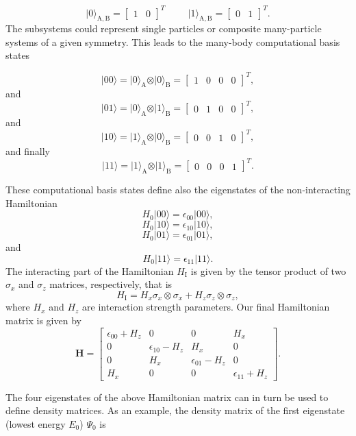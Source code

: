 \documentclass[%
oneside,                 %
final,                   %
10pt]{article}
\begin{document}
\[
\vert 0\rangle_{\mathrm{A,B}}=\begin{bmatrix} 1 & 0\end{bmatrix}^T \hspace{1cm} \vert 1\rangle_{\mathrm{A,B}}=\begin{bmatrix} 0 & 1\end{bmatrix}^T.
\]
The subsystems could represent single particles or composite many-particle systems of a given symmetry.
This leads to the many-body computational basis states

\[
\vert 00\rangle = \vert 0\rangle_{\mathrm{A}}\otimes \vert 0\rangle_{\mathrm{B}}=\begin{bmatrix} 1 & 0 & 0 &0\end{bmatrix}^T,
\]
and
\[
\vert 01\rangle = \vert 0\rangle_{\mathrm{A}}\otimes \vert 1\rangle_{\mathrm{B}}=\begin{bmatrix} 0 & 1 & 0 &0\end{bmatrix}^T,
\]
and
\[
\vert 10\rangle = \vert 1\rangle_{\mathrm{A}}\otimes \vert 0\rangle_{\mathrm{B}}=\begin{bmatrix} 0 & 0 & 1 &0\end{bmatrix}^T,
\]
and finally
\[
\vert 11\rangle = \vert 1\rangle_{\mathrm{A}}\otimes \vert 1\rangle_{\mathrm{B}}=\begin{bmatrix} 0 & 0 & 0 &1\end{bmatrix}^T.
\]

These computational basis states define also the eigenstates of the non-interacting  Hamiltonian
\[
H_0\vert 00 \rangle = \epsilon_{00}\vert 00 \rangle,
\]
\[
H_0\vert 10 \rangle = \epsilon_{10}\vert 10 \rangle,
\]
\[
H_0\vert 01 \rangle = \epsilon_{01}\vert 01 \rangle,
\]
and
\[
H_0\vert 11 \rangle = \epsilon_{11}\vert 11 \rangle.
\]
The interacting part of the Hamiltonian $H_{\mathrm{I}}$ is given by the tensor product of two $\sigma_x$ and $\sigma_z$  matrices, respectively, that is
\[
H_{\mathrm{I}}=H_x\sigma_x\otimes\sigma_x+H_z\sigma_z\otimes\sigma_z,
\]
where $H_x$ and $H_z$ are interaction strength parameters. Our final Hamiltonian matrix is given by
\[
\bm{H}=\begin{bmatrix} \epsilon_{00}+H_z & 0 & 0 & H_x \\
                       0  & \epsilon_{10}-H_z & H_x & 0 \\
		       0 & H_x & \epsilon_{01}-H_z & 0 \\
		       H_x & 0 & 0 & \epsilon_{11} +H_z \end{bmatrix}.
\] 

The four eigenstates of the above Hamiltonian matrix can in turn be used to
define density matrices. As an example, the density matrix of the
first eigenstate (lowest energy $E_0$) $\Psi_0$ is
\end{document}
